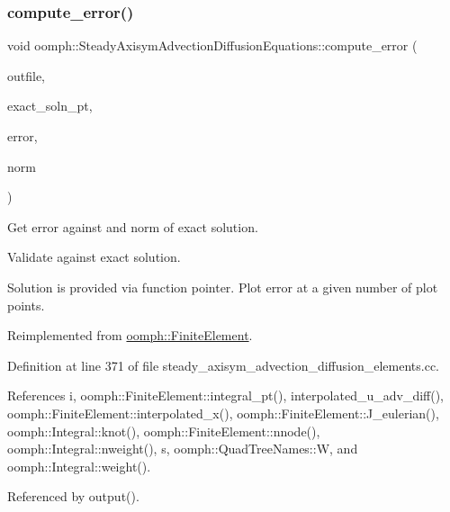 \subsubsection{\texorpdfstring{compute\+\_\+error()}{compute\_error()}}
{\footnotesize\ttfamily void oomph\+::\+Steady\+Axisym\+Advection\+Diffusion\+Equations\+::compute\+\_\+error (\begin{DoxyParamCaption}\item[{std\+::ostream \&}]{outfile,  }\item[{\hyperlink{classoomph_1_1FiniteElement_a690fd33af26cc3e84f39bba6d5a85202}{Finite\+Element\+::\+Steady\+Exact\+Solution\+Fct\+Pt}}]{exact\+\_\+soln\+\_\+pt,  }\item[{double \&}]{error,  }\item[{double \&}]{norm }\end{DoxyParamCaption})\hspace{0.3cm}{\ttfamily [virtual]}}



Get error against and norm of exact solution. 

Validate against exact solution.

Solution is provided via function pointer. Plot error at a given number of plot points. 

Reimplemented from \hyperlink{classoomph_1_1FiniteElement_a73c79a1f1e5b1d334757812a6bbd58ff}{oomph\+::\+Finite\+Element}.



Definition at line 371 of file steady\+\_\+axisym\+\_\+advection\+\_\+diffusion\+\_\+elements.\+cc.



References i, oomph\+::\+Finite\+Element\+::integral\+\_\+pt(), interpolated\+\_\+u\+\_\+adv\+\_\+diff(), oomph\+::\+Finite\+Element\+::interpolated\+\_\+x(), oomph\+::\+Finite\+Element\+::\+J\+\_\+eulerian(), oomph\+::\+Integral\+::knot(), oomph\+::\+Finite\+Element\+::nnode(), oomph\+::\+Integral\+::nweight(), s, oomph\+::\+Quad\+Tree\+Names\+::W, and oomph\+::\+Integral\+::weight().



Referenced by output().

\mbox{\label{classoomph_1_1SteadyAxisymAdvectionDiffusionEquations_a11120f6c10f689ac0406054f3c026eda}} 
